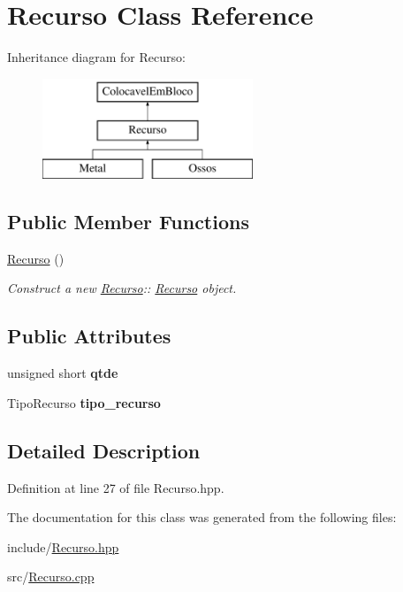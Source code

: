 \hypertarget{class_recurso}{}\section{Recurso Class Reference}
\label{class_recurso}
Inheritance diagram for Recurso\+:\begin{figure}[H]
\begin{center}
\leavevmode
\includegraphics[height=3.000000cm]{class_recurso}
\end{center}
\end{figure}
\subsection*{Public Member Functions}
\begin{DoxyCompactItemize}
\item 
\mbox{\label{class_recurso_a43cf1959ef600190ab7cdb74b9722d11}} 
\mbox{\hyperlink{class_recurso_a43cf1959ef600190ab7cdb74b9722d11}{Recurso}} ()
\begin{DoxyCompactList}\small\item\em Construct a new \mbox{\hyperlink{class_recurso}{Recurso}}\+:\+: \mbox{\hyperlink{class_recurso}{Recurso}} object. \end{DoxyCompactList}\end{DoxyCompactItemize}
\subsection*{Public Attributes}
\begin{DoxyCompactItemize}
\item 
\mbox{\label{class_recurso_a270b8b705353deb293fdda57eb38d567}} 
unsigned short {\bfseries qtde}
\item 
\mbox{\label{class_recurso_a5a3d2e707dd3113235ab1132d0df77a3}} 
Tipo\+Recurso {\bfseries tipo\+\_\+recurso}
\end{DoxyCompactItemize}


\subsection{Detailed Description}


Definition at line 27 of file Recurso.\+hpp.



The documentation for this class was generated from the following files\+:\begin{DoxyCompactItemize}
\item 
include/\mbox{\hyperlink{_recurso_8hpp}{Recurso.\+hpp}}\item 
src/\mbox{\hyperlink{_recurso_8cpp}{Recurso.\+cpp}}\end{DoxyCompactItemize}
